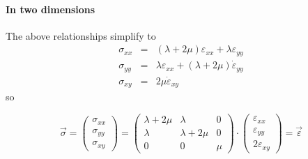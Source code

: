 \paragraph{In two dimensions} The above relationships simplify to 
\begin{eqnarray}
\sigma_{xx} &=& (\lambda+2\mu)  \varepsilon_{xx} + \lambda \varepsilon_{yy} \\
\sigma_{yy} &=& \lambda \varepsilon_{xx} + (\lambda+2\mu)  \dot{\varepsilon}_{yy} \\
\sigma_{xy} &=& 2\mu  \dot{\varepsilon}_{xy} 
\end{eqnarray}
so 

\[
\vec\sigma =
\left(
\begin{array}{c}
\sigma_{xx}\\ 
\sigma_{yy} \\
\sigma_{xy} 
\end{array}
\right)
=
\left(
\begin{array}{ccc}
\lambda+2\mu & \lambda & 0 \\ 
\lambda & \lambda+2\mu & 0 \\
0 & 0 & \mu 
\end{array}
\right)
\cdot
\left(
\begin{array}{c}
\varepsilon_{xx} \\
\varepsilon_{yy} \\
2\varepsilon_{xy} 
\end{array}
\right)
=\vec\varepsilon
\]







